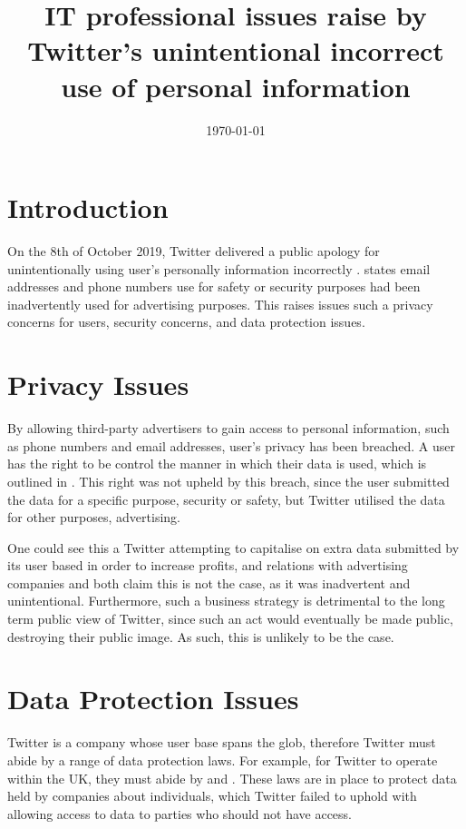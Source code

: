 \documentclass[a4paper, 11pt]{article}
\begin{document}
\title{IT professional issues raise by Twitter's unintentional incorrect use of personal information}
\date{\today}
\maketitle

\section{Introduction}
On the 8th of October 2019, Twitter delivered a public apology for unintentionally using user's personally information incorrectly \parencite{support_twitter_2019}.
\textcite{support_personal_2019} states email addresses and phone numbers use for safety or security purposes had been inadvertently used for advertising purposes.
This raises issues such a privacy concerns for users, security concerns, and data protection issues.

\section{Privacy Issues}
By allowing third-party advertisers to gain access to personal information, such as phone numbers and email addresses, user's privacy has been breached.
A user has the right to be control the manner in which their data is used, which is outlined in \textcite{twitter_privacy_2018}.
This right was not upheld by this breach, since the user submitted the data for a specific purpose, security or safety, but Twitter utilised the data for other purposes, advertising.

One could see this a Twitter attempting to capitalise on extra data submitted by its user based in order to increase profits, and relations with advertising companies
\textcite{support_personal_2019} and \textcite{support_twitter_2019} both claim this is not the case, as it was inadvertent and unintentional.
Furthermore, such a business strategy is detrimental to the long term public view of Twitter, since such an act would eventually be made public, destroying their public image.
As such, this is unlikely to be the case.

\section{Data Protection Issues}
Twitter is a company whose user base spans the glob, therefore Twitter must abide by a range of data protection laws.
For example, for Twitter to operate within the UK, they must abide by \textcite{parliament_of_the_united_kingdom_data_2018} and \textcite{noauthor_regulation_2016}.
These laws are in place to protect data held by companies about individuals, which Twitter failed to uphold with allowing access to data to parties who should not have access.
\end{document}
